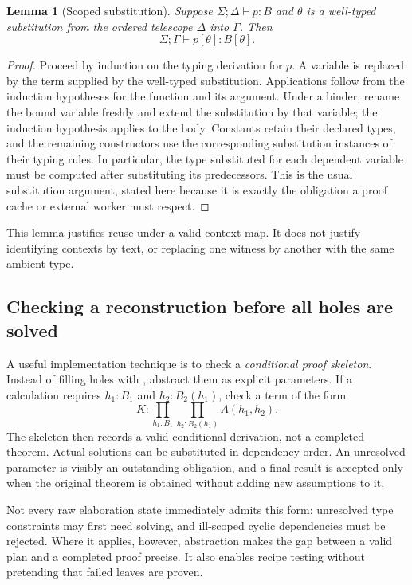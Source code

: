 \documentclass[11pt,letterpaper]{article}
\newcommand{\code}[1]{\texttt{\detokenize{#1}}}
\newtheorem{lemma}[proposition]{Lemma}
\theoremstyle{remark}
\begin{document}
\begin{lemma}[Scoped substitution]
Suppose $\Sigma;\Delta\vdash p:B$ and $\theta$ is a well-typed substitution from the ordered telescope $\Delta$ into $\Gamma$. Then
\[
 \Sigma;\Gamma\vdash p[\theta]:B[\theta].
\]
\end{lemma}
\begin{proof}
Proceed by induction on the typing derivation for $p$. A variable is replaced by the term supplied by the well-typed substitution. Applications follow from the induction hypotheses for the function and its argument. Under a binder, rename the bound variable freshly and extend the substitution by that variable; the induction hypothesis applies to the body. Constants retain their declared types, and the remaining constructors use the corresponding substitution instances of their typing rules. In particular, the type substituted for each dependent variable must be computed after substituting its predecessors. This is the usual substitution argument, stated here because it is exactly the obligation a proof cache or external worker must respect.
\end{proof}

This lemma justifies reuse under a valid context map. It does not justify identifying contexts by text, or replacing one witness by another with the same ambient type.

\subsection{Checking a reconstruction before all holes are solved}

A useful implementation technique is to check a \emph{conditional proof skeleton}. Instead of filling holes with \code{sorry}, abstract them as explicit parameters. If a calculation requires $h_1:B_1$ and $h_2:B_2(h_1)$, check a term of the form
\[
 K:\prod_{h_1:B_1}\prod_{h_2:B_2(h_1)}A(h_1,h_2).
\]
The skeleton then records a valid conditional derivation, not a completed theorem. Actual solutions can be substituted in dependency order. An unresolved parameter is visibly an outstanding obligation, and a final result is accepted only when the original theorem is obtained without adding new assumptions to it.

Not every raw elaboration state immediately admits this form: unresolved type constraints may first need solving, and ill-scoped cyclic dependencies must be rejected. Where it applies, however, abstraction makes the gap between a valid plan and a completed proof precise. It also enables recipe testing without pretending that failed leaves are proven.
\end{document}
